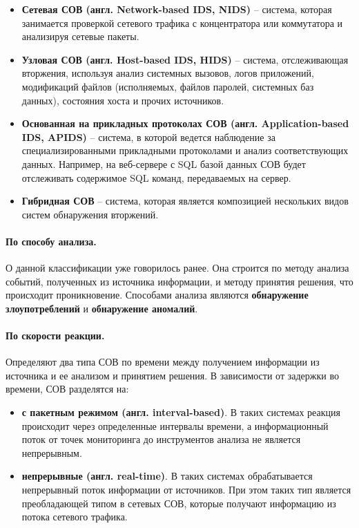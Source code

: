 \begin{itemize}
	\item \textbf{Сетевая СОВ (англ. Network-based IDS, NIDS)} -- система, 
	которая занимается проверкой сетевого трафика с концентратора или коммутатора и анализируя сетевые пакеты.
	\item \textbf{Узловая СОВ (англ. Host-based IDS, HIDS)} -- система, 
	отслеживающая вторжения, используя анализ системных вызовов, логов приложений, модификаций файлов 
	(исполняемых, файлов паролей, системных баз данных), состояния хоста и прочих источников. 
	\item \textbf{Основанная на прикладных протоколах СОВ (англ. Application-based IDS, APIDS)} -- система, 
	в которой ведется наблюдение за специализированными прикладными протоколами и анализ соответствующих 
	данных. Например, на веб-сервере с SQL базой данных СОВ будет отслеживать содержимое SQL команд, 
	передаваемых на сервер.
	\item \textbf{Гибридная СОВ} -- система, которая является композицией нескольких видов 
	систем обнаружения вторжений.
\end{itemize}


\paragraph*{По способу анализа.}

О данной классификации уже говорилось ранее. Она строится по методу анализа событий, полученных из источника 
информации, и методу принятия решения, что происходит проникновение. Способами анализа являются 
\textbf{обнаружение злоупотреблений} и \textbf{обнаружение аномалий}.


\paragraph*{По скорости реакции.}

Определяют два типа СОВ по времени между получением информации из источника и ее анализом и принятием решения.
В зависимости от задержки во времени, СОВ разделятся на:
\begin{itemize}
	\item \textbf{с пакетным режимом (англ. interval-based)}. В таких системах реакция происходит 
	через определенные интервалы времени, а информационный поток от точек мониторинга до инструментов анализа
	не является непрерывным.
	\item \textbf{непрерывные (англ. real-time)}. В таких системах обрабатывается непрерывный поток информации 
	от источников. При этом таких тип является преобладающей типом в сетевых СОВ, которые получают 
	информацию из потока сетевого трафика.
\end{itemize}


